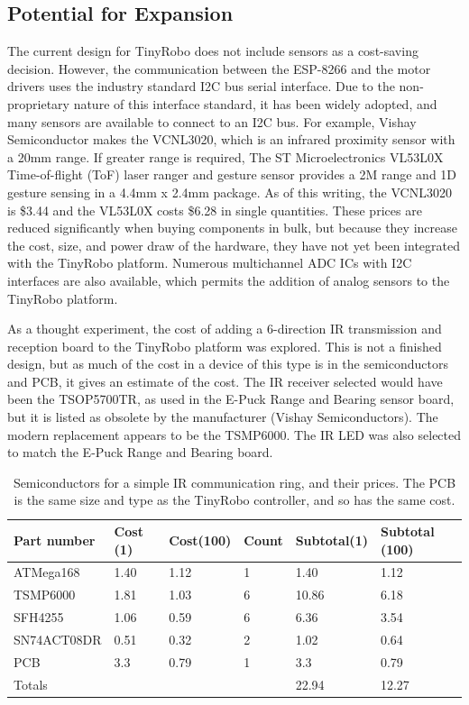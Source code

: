 \documentclass[]{article}
\begin{document}
\subsection{Potential for Expansion}

The current design for TinyRobo does not include sensors as a cost-saving decision. 
However, the communication between the ESP-8266 and the motor drivers uses the industry standard I2C bus serial interface. 
Due to the non-proprietary nature of this interface standard, it has been widely adopted, and many sensors are available to connect to an I2C bus. 
For example, Vishay Semiconductor makes the VCNL3020, which is an infrared proximity sensor with a 20mm range. 
If greater range is required, The ST Microelectronics VL53L0X Time-of-flight (ToF) laser ranger and gesture sensor provides a 2M range and 1D gesture sensing in a 4.4mm x 2.4mm package. 
As of this writing, the VCNL3020 is \$3.44 and the VL53L0X costs \$6.28 in single quantities.
These prices are reduced significantly when buying components in bulk, but because they increase the cost, size, and power draw of the hardware, they have not yet been integrated with the TinyRobo platform. 
Numerous multichannel ADC ICs with I2C interfaces are also available, which permits the addition of analog sensors to the TinyRobo platform. 

As a thought experiment, the cost of adding a 6-direction IR transmission and reception board  to the TinyRobo platform was explored. 
This is not a finished design, but as much of the cost in a device of this type is in the semiconductors and PCB, it gives an estimate of the cost. 
The IR receiver selected would have been the TSOP5700TR, as used in the E-Puck Range and Bearing sensor board, but it is listed as obsolete by the manufacturer (Vishay Semiconductors). 
The modern replacement appears to be the TSMP6000.
The IR LED was also selected to match the E-Puck Range and Bearing board.

\begin{table}
	\begin{tabular}{l l l l l l}
	Part number & Cost (1) & Cost(100) & Count & Subtotal(1) & Subtotal (100)\\
	\hline 
	ATMega168 & 1.40 & 1.12 & 1 & 1.40 & 1.12  \\
	TSMP6000 & 1.81 & 1.03 & 6 & 10.86 & 6.18  \\
	SFH4255  & 1.06 & 0.59 & 6 & 6.36 & 3.54 \\
	SN74ACT08DR & 0.51 & 0.32 & 2 & 1.02 & 0.64 \\
	PCB & 3.3 & 0.79 & 1 & 3.3 & 0.79\\
	\hline 
	Totals & & & & 22.94 & 12.27\\
	\end{tabular}
	\caption{Semiconductors for a simple IR communication ring, and their prices. The PCB is the same size and type as the TinyRobo controller, and so has the same cost.}
	\label{tab:ir_ranger_board}
\end{table}
\end{document}
